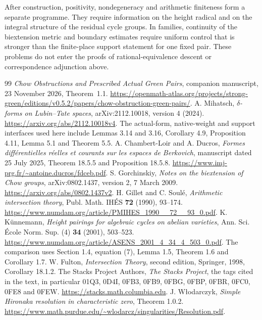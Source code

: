 \documentclass[11pt,a4paper]{article}
\theoremstyle{definition}
\theoremstyle{remark}
\numberwithin{equation}{section}
\begin{document}
After construction, positivity, nondegeneracy and arithmetic finiteness form a separate programme. They require information on the height radical and on the integral structure of the residual cycle groups. In families, continuity of the biextension metric and boundary estimates require uniform control that is stronger than the finite-place support statement for one fixed pair. These problems do not enter the proofs of rational-equivalence descent or correspondence adjunction above.


\begin{thebibliography}{99}
 \emph{Chow Obstructions and Prescribed Actual Green Pairs}, companion manuscript, 23 November 2026, Theorem~1.1. \url{https://openmath-atlas.org/projects/strong-green/editions/v0.5.2/papers/chow-obstruction-green-pairs/}.
 A. Mihatsch, \emph{$\delta$-forms on Lubin--Tate spaces}, arXiv:2112.10018, version 4 (2024). \url{https://arxiv.org/abs/2112.10018v4}. The actual-form, native-weight and support interfaces used here include Lemmas 3.14 and 3.16, Corollary 4.9, Proposition 4.11, Lemma 5.1 and Theorem 5.5.
 A. Chambert-Loir and A. Ducros, \emph{Formes diff\'erentielles r\'eelles et courants sur les espaces de Berkovich}, manuscript dated 25 July 2025, Theorem 18.5.5 and Proposition 18.5.8. \url{https://www.imj-prg.fr/~antoine.ducros/fdceb.pdf}.
 S. Gorchinskiy, \emph{Notes on the biextension of Chow groups}, arXiv:0802.1437, version 2, 7 March 2009. \url{https://arxiv.org/abs/0802.1437v2}.
 H. Gillet and C. Soul\'e, \emph{Arithmetic intersection theory}, Publ. Math. IH\'ES \textbf{72} (1990), 93--174. \url{https://www.numdam.org/article/PMIHES_1990__72__93_0.pdf}.
 K. K\"unnemann, \emph{Height pairings for algebraic cycles on abelian varieties}, Ann. Sci. \'Ecole Norm. Sup. (4) \textbf{34} (2001), 503--523. \url{https://www.numdam.org/article/ASENS_2001_4_34_4_503_0.pdf}. The comparison uses Section 1.4, equation (7), Lemma 1.5, Theorem 1.6 and Corollary 1.7.
 W. Fulton, \emph{Intersection Theory}, second edition, Springer, 1998, Corollary 18.1.2.
 The Stacks Project Authors, \emph{The Stacks Project}, the tags cited in the text, in particular 01Q3, 0D4I, 0FB3, 0FB9, 0FBG, 0FBP, 0FBR, 0FC0, 0FE8 and 0FEW. \url{https://stacks.math.columbia.edu}.
 J. W\l odarczyk, \emph{Simple Hironaka resolution in characteristic zero}, Theorem 1.0.2. \url{https://www.math.purdue.edu/~wlodarcz/singularities/Resolution.pdf}.

\end{thebibliography}
\end{document}
